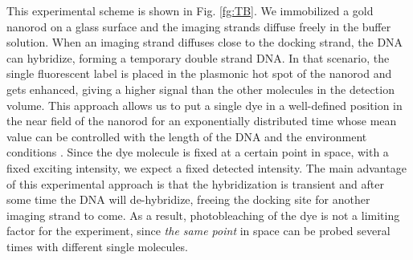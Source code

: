 This experimental scheme is shown in Fig. \ref{fg:TB}. We immobilized 
a gold nanorod on a glass surface and the imaging strands diffuse 
freely in the buffer solution. %
When an imaging strand diffuses close to the 
docking strand, the DNA can hybridize, forming a temporary double strand DNA. 
In that scenario, the single fluorescent label is placed in the plasmonic 
hot spot of the nanorod and gets enhanced, giving a higher signal than the 
other molecules in the detection volume. 
This approach allows us to put a single dye in a well-defined position in the 
near field of the nanorod for an exponentially distributed time whose 
mean value can be controlled with the length of the DNA and the 
environment conditions \cite{jungmann2010single}. Since the dye molecule is fixed at a 
certain point in space, with a fixed exciting intensity, we expect a 
fixed detected intensity. The main advantage of this experimental 
approach is that the hybridization is transient and after some time 
the DNA will de-hybridize, freeing the docking site for another 
imaging strand to come. As a result, photobleaching of the dye 
is not a limiting factor for the experiment, since \textit{the same point} 
in space can be probed several times with different single molecules.

